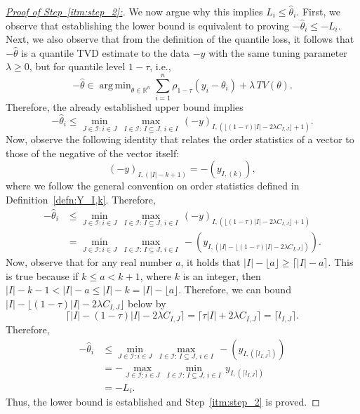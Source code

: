 \documentclass[11pt]{article}
\newcommand{\cI}{\mathcal{I}}
\newcommand{\bR}{\mathbb{R}}
\DeclareMathOperator*{\argmin}{arg\,min}
\theoremstyle{plain}
\theoremstyle{definition}
\theoremstyle{remark}
\begin{document}
\begin{proof}[\underline{Proof of Step~\ref{itm:step_2}:}]
We now argue why this implies $L_i\leq \hat{\theta}_i$. First, we observe that establishing the lower bound is equivalent to proving $-\hat{\theta}_i\leq -L_i$. Next, we also observe that from the definition of the quantile loss, it follows that $-\hat{\theta}$ is a quantile TVD estimate to the data $-y$ with the same tuning parameter $\lambda\geq 0$, but for quantile level $1-\tau$, i.e.,
\[-\hat{\theta}\in \argmin_{\theta \in \bR^n}\sum_{i=1}^{n}\rho_{1-\tau}(y_i-\theta_i)+\lambda\,TV(\theta).\]
Therefore, the already established upper bound implies
\[-\hat{\theta}_i\leq \min_{J\in \cI:i\in J}\,\max_{I\in \cI:\,I\subseteq J,\,i\in I}\,(-y)_{I,(\lfloor (1-\tau)|I|-2\lambda C_{I,J}\rfloor+1)}.\]
Now, observe the following identity that relates the order statistics of a vector to those of the negative of the vector itself:
\begin{equation}\label{eqn:order_stat_neg_vector}
    (-y)_{I,(|I|-k+1)}=-(y_{I,(k)}),
\end{equation}
where we follow the general convention on order statistics defined in Definition~\ref{defn:Y_I,k}. Therefore,
\begin{align*}
    -\hat{\theta}_i&\leq \min_{J\in \cI:i\in J}\,\max_{I\in \cI:\,I\subseteq J,\,i\in I}\,(-y)_{I,(\lfloor (1-\tau)|I|-2\lambda C_{I,J}\rfloor+1)}\\
    &=\min_{J\in \cI:i\in J}\,\max_{I\in \cI:\,I\subseteq J,\,i\in I}\,-(y_{I,(|I|-\lfloor (1-\tau)|I|-2\lambda C_{I,J}\rfloor)}).
\end{align*}
Now, observe that  for any real number $a$, it holds that \(|I|-\lfloor a \rfloor\geq \lceil |I|-a\rceil.\) This is true because if $k\leq a < k+1$, where $k$ is an integer, then $|I|-k-1<|I|-a\leq |I|-k=|I|-\lfloor a \rfloor$. Therefore, we can bound \(|I|-\lfloor (1-\tau)|I|-2\lambda C_{I,J}\rfloor\) below by \[\lceil |I|-(1-\tau)|I|-2\lambda C_{I,J}\rceil=\lceil \tau |I|+2\lambda C_{I,J}\rceil=\lceil l_{I,J}\rceil.\]
Therefore,
\begin{align*}
    -\hat{\theta}_i&\leq \min_{J\in \cI:i\in J}\,\max_{I\in \cI:\,I\subseteq J,\,i\in I}\,-(y_{I,(\lceil l_{I,J}\rceil)})\\
    &=-\max_{J\in \cI:i\in J}\,\min_{I\in \cI:\,I\subseteq J,\,i\in I}\,y_{I,(\lceil l_{I,J}\rceil)}\\
    &=-L_i.
\end{align*}
Thus, the lower bound is established and Step~\ref{itm:step_2} is proved.
\end{proof}
\end{document}
